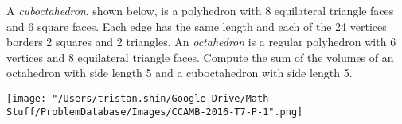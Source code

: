 A \emph{cuboctahedron}, shown below, is a polyhedron with 8 equilateral triangle faces and 6 square faces. Each edge has the same length and each of the 24 vertices borders 2 squares and 2 triangles. An \emph{octahedron} is a regular polyhedron with 6 vertices and 8 equilateral triangle faces. Compute the sum of the volumes of an octahedron with side length 5 and a cuboctahedron with side length 5.
\begin{center}
	\texttt{[image: "/Users/tristan.shin/Google Drive/Math Stuff/ProblemDatabase/Images/CCAMB-2016-T7-P-1".png]}
\end{center}